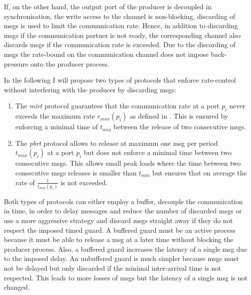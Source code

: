 If, on the other hand, the output port of the producer is decoupled in synchronisation, \ie the write access to the channel is non-blocking, discarding of \glspl*{msg} is used to limit the communication rate.
Hence, in addition to discarding \glspl*{msg} if the communication partner is not ready, the corresponding channel also discards \glspl*{msg} if the communication rate is exceeded.
Due to the discarding of \glspl*{msg} the rate-bound on the communication channel does not impose back-pressure onto the producer process.

In the following I will propose two types of protocols that enforce rate-control without interfering with the producer by discarding \glspl*{msg}:
\begin{enumerate}
    \item The \emph{\gls{mirt}} protocol guarantees that the communication rate at a port $p_i$ never exceeds the maximum rate $r_{max}(p_i)$ as defined in \Equ{\ref{eq_rate_max}}.
        This is ensured by enforcing a minimal time of $t_{mia}$ between the release of two consecutive \glspl*{msg}.
    \item The \emph{\gls{pbrt}} protocol allows to release at maximum one \gls*{msg} per period $t_{max}(p_i)$ at a port $p_i$ but does not enforce a minimal time between two consecutive \glspl*{msg}.
        This allows small peak loads where the time between two consecutive \glspl*{msg} releases is smaller than $t_{mia}$ but ensures that on average the rate of $\frac{1}{t_{mia}(p_i)}$ is not exceeded.
\end{enumerate}

Both types of protocols can either employ a buffer, \ie decouple the communication in time, in order to delay messages and reduce the number of discarded \glspl*{msg} or use a more aggressive strategy and discard \glspl*{msg} straight away if they do not respect the imposed timed guard.
A buffered guard must be an active process because it must be able to release a \gls*{msg} at a later time without blocking the producer process.
Also, a buffered guard increases the latency of a single \gls*{msg} due to the imposed delay.
An unbuffered guard is much simpler because \glspl*{msg} must not be delayed but only discarded if the minimal inter-arrival time is not respected.
This leads to more losses of \glspl*{msg} but the latency of a single \gls*{msg} is not changed.

